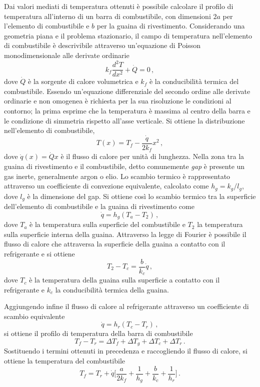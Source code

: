 Dai valori mediati di temperatura ottenuti è possibile calcolare il profilo di 
temperatura all'interno di un barra di combustibile, con dimensioni $2a$ per 
l'elemento di combustibile e $b$ per la guaina di rivestimento.
Considerando una geometria piana e il problema stazionario, il campo di 
temperatura nell'elemento di combustibile è descrivibile attraverso 
un'equazione 
di Poisson monodimensionale alle derivate ordinarie
\begin{equation}
k_f \frac{d^2 T}{dx^2} + \dot{Q} = 0  \,,
\end{equation}
dove $\dot{Q}$ è la sorgente di calore volumetrica e $k_f$ è la conducibilità 
termica del combustibile.
Essendo un'equazione differenziale del secondo ordine alle derivate ordinarie e 
non omogenea è richiesta per la sua risoluzione le condizioni al contorno; la 
prima esprime che la temperatura è massima al centro della barra e le 
condizione 
di simmetria rispetto all'asse verticale.
Si ottiene la distribuzione nell'elemento di combustibile,
\begin{equation}
T(x)=T_f - \frac{\dot{q}}{2k_f}x^2 \,,
\end{equation}
dove $\dot{q}(x)=\dot{Q}x$ è il flusso di calore per unità di lunghezza.
Nella zona tra la guaina di rivestimento e il combustibile, detto comunemente 
{\it gap}
è presente un gas inerte, 
generalmente argon o elio.
Lo scambio termico è rappresentato attraverso un coefficiente di convezione 
equivalente, calcolato come $h_g=k_g/l_g$, dove $l_g$ è la dimensione del gap. 
Si ottiene così lo scambio termico tra la superficie dell'elemento di 
combustibile e la guaina di rivestimento come
\begin{equation}
 \dot{q}= h_g (T_a - T_2) \,,
\end{equation}
dove $T_a$ è la temperatura sulla superficie del combustibile e $T_2$ la 
temperatura sulla superficie interna della guaina.
Attraverso la legge di Fourier è possibile il flusso di calore che attraversa 
la 
superficie della guaina a contatto con il refrigerante e si ottiene
\begin{equation}
T_2 - T_c = \frac{b}{k_c} \dot{q}\,,
\end{equation}
dove $T_c$ è la temperatura della guaina sulla superficie a contatto con il 
refrigerante e $k_c$ la conducibilità termica della guaina.

Aggiungendo infine il flusso di calore al refrigerante attraverso un 
coefficiente di scambio equivalente
\begin{equation}
 \dot{q}= h_r (T_c - T_r) \,,
\end{equation}
si ottiene il profilo di temperatura della barra di combustibile
\begin{equation}
 T_f - T_r = \Delta T_f + \Delta T_g + \Delta T_c + \Delta T_r \,.
\end{equation}
Sostituendo i termini ottenuti in precedenza e raccogliendo il flusso di 
calore, 
si ottiene la temperatura del combustibile
\begin{equation}
 T_f = T_r + \dot{q} \bigl[ \frac{a}{2 k_f} + \frac{1}{h_g} + \frac{b}{k_c} + 
\frac{1}{h_r} \bigr] \,.
\end{equation}




 





